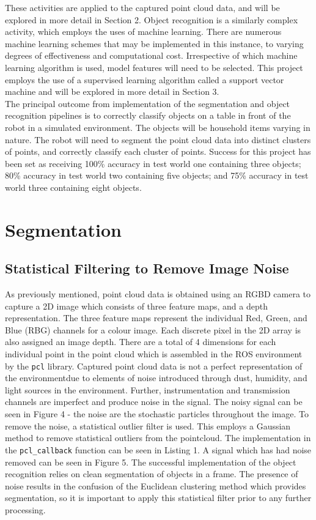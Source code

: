 \documentclass[a4paper]{article}
\begin{document}
These activities are applied to the captured point cloud data, and will be explored in more detail in Section 2. Object recognition is a similarly complex activity, which employs the uses of machine learning. There are numerous machine learning schemes that may be implemented in this instance, to varying degrees of effectiveness and computational cost. Irrespective of which machine learning algorithm is used, model features will need to be selected. This project employs the use of a supervised learning algorithm called a support vector machine and will be explored in more detail in Section 3.\\

The principal outcome from implementation of the segmentation and object recognition pipelines is to correctly classify objects on a table in front of the robot in a simulated environment. The objects will be household items varying in nature. The robot will need to segment the point cloud data into distinct clusters of points, and correctly classify each cluster of points. Success for this project has been set as receiving 100\% accuracy in test world one containing three objects; 80\% accuracy in test world two containing five objects; and 75\% accuracy in test world three containing eight objects.

\newpage


\section{Segmentation}
\subsection{Statistical Filtering to Remove Image Noise}
As previously mentioned, point cloud data is obtained using an RGBD camera to capture a 2D image which consists of three feature maps, and a depth representation. The three feature maps represent the individual Red, Green, and Blue (RBG) channels for a colour image. Each discrete pixel in the 2D array is also assigned an image depth. There are a total of 4 dimensions for each individual point in the point cloud which is assembled in the ROS environment by the \verb|pcl| library. Captured point cloud data is not a perfect representation of the environmentdue to elements of noise introduced through dust, humidity, and light sources in the environment. Further, instrumentation and transmission channels are imperfect and produce noise in the signal. The noisy signal can be seen in Figure 4 - the noise are the stochastic particles throughout the image. To remove the noise, a statistical outlier filter is used. This employs a Gaussian method to remove statistical outliers from the pointcloud. The implementation in the \verb|pcl_callback| function can be seen in Listing 1. A signal which has had noise removed can be seen in Figure 5. The successful implementation of the object recognition relies on clean segmentation of objects in a frame. The presence of noise results in the confusion of the Euclidean clustering method which provides segmentation, so it is important to apply this statistical filter prior to any further processing.
\end{document}
